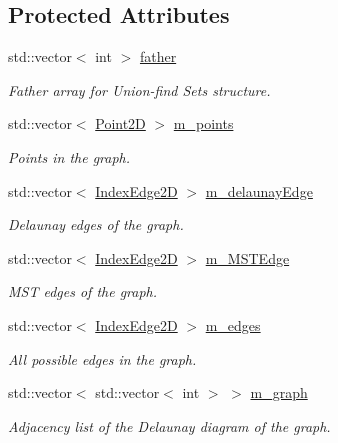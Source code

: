 \subsection*{Protected Attributes}
\begin{DoxyCompactItemize}
\item 
std::vector$<$ int $>$ \hyperlink{classcmst_1_1_graph2_d_ad5d251f2f6f8b827af4404985fcec53c}{father}
\begin{DoxyCompactList}\small\item\em Father array for Union-\/find Sets structure. \end{DoxyCompactList}\item 
std::vector$<$ \hyperlink{classcmst_1_1_point2_d}{Point2D} $>$ \hyperlink{classcmst_1_1_graph2_d_a32456f3c630e34a56ce3109183142c10}{m\_points}
\begin{DoxyCompactList}\small\item\em Points in the graph. \end{DoxyCompactList}\item 
std::vector$<$ \hyperlink{classcmst_1_1_index_edge2_d}{IndexEdge2D} $>$ \hyperlink{classcmst_1_1_graph2_d_a6fe64b2078ec3c700a8a2e2bd77e2dae}{m\_delaunayEdge}
\begin{DoxyCompactList}\small\item\em Delaunay edges of the graph. \end{DoxyCompactList}\item 
std::vector$<$ \hyperlink{classcmst_1_1_index_edge2_d}{IndexEdge2D} $>$ \hyperlink{classcmst_1_1_graph2_d_a1cc96b5251162964ac21f46955ac8271}{m\_MSTEdge}
\begin{DoxyCompactList}\small\item\em MST edges of the graph. \end{DoxyCompactList}\item 
std::vector$<$ \hyperlink{classcmst_1_1_index_edge2_d}{IndexEdge2D} $>$ \hyperlink{classcmst_1_1_graph2_d_a31a6b042c1c1941ee59672b842c7d3c9}{m\_edges}
\begin{DoxyCompactList}\small\item\em All possible edges in the graph. \end{DoxyCompactList}\item 
std::vector$<$ std::vector$<$ int $>$ $>$ \hyperlink{classcmst_1_1_graph2_d_a5df9c78edb4f5c68da11b01e44061dc5}{m\_graph}
\begin{DoxyCompactList}\small\item\em Adjacency list of the Delaunay diagram of the graph. \end{DoxyCompactList}\item 

\end{DoxyCompactItemize}
